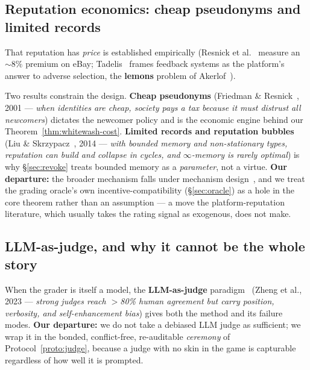 \documentclass[11pt,a4paper]{article}
\theoremstyle{definition}
\begin{document}
\subsection{Reputation economics: cheap pseudonyms and limited records}

That reputation has \emph{price} is established empirically (Resnick et
al.~ measure an ${\sim}8\%$ premium on eBay; Tadelis~
frames feedback systems as the platform's answer to adverse selection, the
\textbf{lemons} problem of Akerlof~).

Two results constrain the
design. \textbf{Cheap pseudonyms} (Friedman \& Resnick~,
2001 --- \emph{when identities are cheap, society pays a tax because it must
distrust all newcomers}) dictates the newcomer policy and is the economic engine
behind our Theorem~\ref{thm:whitewash-cost}. \textbf{Limited records and reputation
bubbles} (Liu \& Skrzypacz~, 2014 --- \emph{with bounded
memory and non-stationary types, reputation can build and collapse in cycles, and
$\infty$-memory is rarely optimal}) is why \S\ref{sec:revoke} treats bounded memory
as a \emph{parameter}, not a virtue. \textbf{Our departure:} the broader mechanism
falls under mechanism design~, and we treat the
grading oracle's own incentive-compatibility (\S\ref{sec:oracle}) as a hole in the
core theorem rather than an assumption --- a move the platform-reputation
literature, which usually takes the rating signal as exogenous, does not make.

\ifdefined\pdswisslandmarkplate
\begin{figure}[p]
  \centering
\end{figure}
\fi

\subsection{LLM-as-judge, and why it cannot be the whole story}

When the grader is itself a model, the \textbf{LLM-as-judge}
paradigm~ (Zheng et al., 2023 --- \emph{strong judges reach
$>$80\% human agreement but carry position, verbosity, and self-enhancement bias})
gives both the method and its failure modes. \textbf{Our departure:} we do not take
a debiased LLM judge as sufficient; we wrap it in the bonded, conflict-free,
re-auditable \emph{ceremony} of Protocol~\ref{proto:judge}, because a judge with no
skin in the game is capturable regardless of how well it is prompted.
\end{document}
